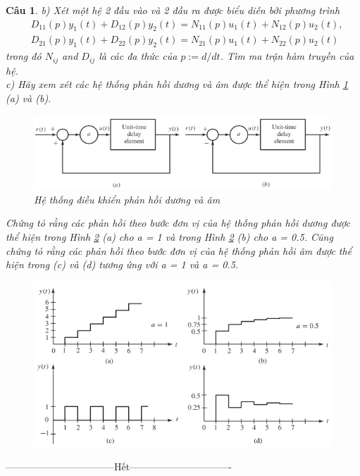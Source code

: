 \documentclass[11pt]{article}
\newtheorem{bt}{Câu}
\begin{document}
\begin{bt}
	\noindent b) Xét một hệ 2 đầu vào và 2 đầu ra được biểu diễn bởi phương trình
	\begin{align*}
		& D_{11}(p)y_1(t) + D_{12}(p)y_2(t) = N_{11}(p)u_1(t) + N_{12}(p)u_2(t), \\
		& D_{21}(p)y_1(t) + D_{22}(p)y_2(t) = N_{21}(p)u_1(t) + N_{22}(p)u_2(t)
	\end{align*}
	trong đó $N_{ij}$ and $D_{ij}$ là các đa thức của $p := d/dt$. Tìm ma trận hàm truyền của hệ.\\
	c) Hãy xem xét các hệ thống phản hồi dương và âm được thể hiện trong Hình \ref{fig:fig2} (a) và (b). 
	\begin{figure}[h!]
		\centering
		\includegraphics[width=1.0\linewidth]{Fig2.5}
		\caption{Hệ thống điều khiển phản hồi dương và âm}
		\label{fig:fig2}
	\end{figure}
	Chứng tỏ rằng các phản hồi theo bước đơn vị của hệ thống phản hồi dương được thể hiện trong Hình \ref{fig:fig3} (a) cho a = 1 và trong Hình \ref{fig:fig3} (b) cho a = 0.5. Cũng chứng tỏ rằng các phản hồi theo bước đơn vị của hệ thống phản hồi âm được thể hiện trong (c) và (d) tương ứng với a = 1 và a = 0.5.
	\begin{figure}[h!]
		\centering
		\includegraphics[width=1.0\linewidth]{Fig2.21}
		\caption{}
		\label{fig:fig3}
	\end{figure}
\end{bt}

\centerline{———————————Hết——————————-}
\end{document}
